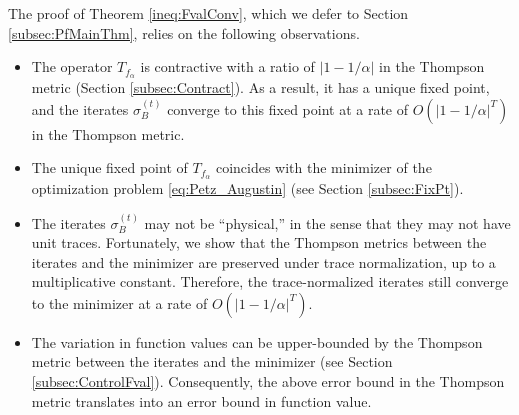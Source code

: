 \documentclass{article}
\begin{document}
The proof of Theorem \ref{ineq:FvalConv}, which we defer to Section \ref{subsec:PfMainThm}, relies on the following observations.
\begin{itemize}
    \item %
    The operator $T_{f_{\alpha}}$ is contractive with a ratio of $| 1 - 1 / \alpha |$ in the Thompson metric (Section \ref{subsec:Contract}). 
    As a result, it has a unique fixed point, and the iterates $\sigma_B^{(t)}$ converge to this fixed point at a rate of $O\left(|1-1/\alpha|^T\right)$
    in the Thompson metric. 
    \item The unique fixed point of $T_{f_{\alpha}}$ 
    coincides with 
    the minimizer of the optimization problem \eqref{eq:Petz_Augustin} (see Section \ref{subsec:FixPt}).
    \item %
	The iterates $\sigma_B^{(t)}$ may not be ``physical,'' in the sense that they may not have unit traces.
	Fortunately, we show that the Thompson metrics between the iterates and the minimizer are preserved under trace normalization, up to a multiplicative constant. 
    Therefore, the trace-normalized iterates still converge 
    to the minimizer
    at a rate of $O\left(|1-1/\alpha|^T\right)$.
    \item %
    The variation in function values can be upper-bounded by the Thompson metric between the iterates and the minimizer (see Section \ref{subsec:ControlFval}). 
    Consequently, the above error bound in the Thompson metric translates into an error bound in function value.
\end{itemize}
\end{document}
